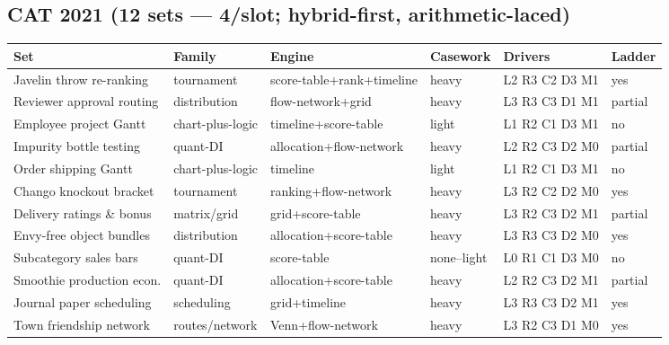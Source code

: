 \documentclass[11pt,a4paper]{article}
\newcommand{\invtab}{\footnotesize}
\begin{document}
\subsection{CAT 2021 (12 sets --- 4/slot; hybrid-first, arithmetic-laced)}
{\invtab
\begin{longtable}{p{3.0cm}p{2.05cm}p{2.5cm}p{1.2cm}p{2.05cm}p{1.7cm}}
\toprule
\textbf{Set} & \textbf{Family} & \textbf{Engine} & \textbf{Casework} & \textbf{Drivers} & \textbf{Ladder} \\
\midrule
\endhead
Javelin throw re-ranking & tournament & score-table+rank+timeline & heavy & L2 R3 C2 D3 M1 & yes \\
Reviewer approval routing & distribution & flow-network+grid & heavy & L3 R3 C3 D1 M1 & partial \\
Employee project Gantt & chart-plus-logic & timeline+score-table & light & L1 R2 C1 D3 M1 & no \\
Impurity bottle testing & quant-DI & allocation+flow-network & heavy & L2 R2 C3 D2 M0 & partial \\
Order shipping Gantt & chart-plus-logic & timeline & light & L1 R2 C1 D3 M1 & no \\
Chango knockout bracket & tournament & ranking+flow-network & heavy & L3 R2 C2 D2 M0 & yes \\
Delivery ratings \& bonus & matrix/grid & grid+score-table & heavy & L3 R2 C3 D2 M1 & partial \\
Envy-free object bundles & distribution & allocation+score-table & heavy & L3 R3 C3 D2 M0 & yes \\
Subcategory sales bars & quant-DI & score-table & none--light & L0 R1 C1 D3 M0 & no \\
Smoothie production econ. & quant-DI & allocation+score-table & heavy & L2 R2 C3 D2 M1 & partial \\
Journal paper scheduling & scheduling & grid+timeline & heavy & L3 R3 C3 D2 M1 & yes \\
Town friendship network & routes/network & Venn+flow-network & heavy & L3 R2 C3 D1 M0 & yes \\
\bottomrule
\end{longtable}}
\end{document}
